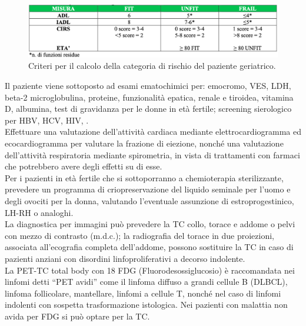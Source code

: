\begin{figure}[H]
    \begin{center}
    \includegraphics[width=0.7\columnwidth]{img/FIT-UNFIT-FRAIL.png}
    \vspace{-3mm}
    \end{center}
    \caption{Criteri per il calcolo della categoria di rischio del paziente geriatrico.
    \cite{AIOM}}

\end{figure}

Il paziente viene sottoposto ad esami ematochimici per: emocromo, VES, LDH, beta-2 microglobulina, proteine, 
funzionalità epatica, renale e tiroidea, vitamina D, albumina, test di gravidanza per le donne in età fertile; 
screening sierologico per HBV, HCV, HIV\cite{AIOM}, \cite{reteveneta}.\\
Effettuare una valutazione dell’attività cardiaca mediante elettrocardiogramma ed ecocardiogramma per valutare 
la frazione di eiezione, nonché una valutazione dell’attività respiratoria mediante spirometria, in vista di 
trattamenti con farmaci che potrebbero avere degli effetti su di esse\cite{AIOM}.\\ 
Per i pazienti in età fertile che si sottoporranno a chemioterapia sterilizzante, prevedere un programma di 
criopreservazione del liquido seminale per l’uomo e degli ovociti per la donna, valutando l’eventuale assunzione di 
estroprogestinico, LH-RH o analoghi\cite{AIOM}.\\

La diagnostica per immagini può prevedere la TC collo, torace e addome o pelvi con mezzo di contrasto (m.d.c.); 
la radiografia del torace in due proiezioni, associata all’ecografia completa dell’addome, possono sostituire 
la TC in caso di pazienti anziani con disordini linfoproliferativi a decorso indolente.\\
La PET-TC total body con 18 FDG (Fluorodesossiglucosio) è raccomandata nei linfomi detti “PET avidi” come il linfoma diffuso 
a grandi cellule B (DLBCL), linfoma follicolare, mantellare, linfomi a cellule T, nonché nel caso di linfomi indolenti 
con sospetta trasformazione istologica. Nei pazienti con malattia non avida per FDG si può optare per la TC\cite{reteveneta}.\\ 

